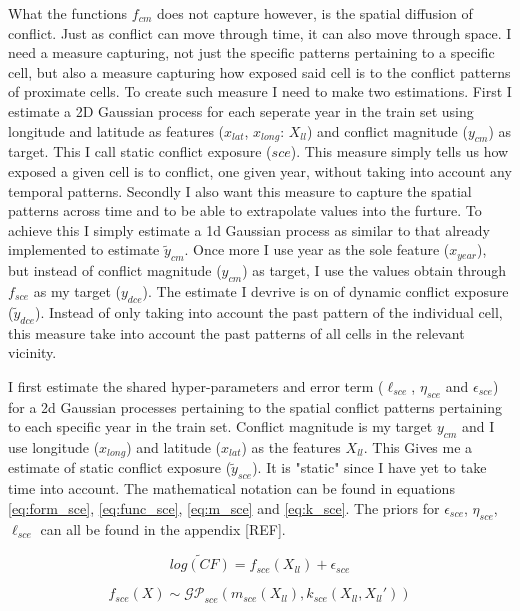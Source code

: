 \documentclass[a4paper]{article}
\begin{document}
What the functions $f_{cm}$ does not capture however, is the spatial diffusion of conflict. Just as conflict can move through time, it can also move through space. I need a measure capturing, not just the specific patterns pertaining to a specific cell, but also a measure capturing how exposed said cell is to the conflict patterns of proximate cells. To create such measure I need to make two estimations. First I estimate a 2D Gaussian process for each seperate year in the train set using longitude and latitude as features ($x_{lat}$, $x_{long}$: $X_{ll}$) and conflict magnitude  ($y_{cm}$) as target. This I call static conflict exposure ($sce$). This measure simply tells us how exposed a given cell is to conflict, one given year, without taking into account any temporal patterns. Secondly I also want this measure to capture the spatial patterns across time and to be able to extrapolate values into the furture. To achieve this I simply estimate a 1d Gaussian process as similar to that already implemented to estimate $\tilde{y}_{cm}$. Once more I use year as the sole feature ($x_{year}$), but instead of conflict magnitude ($y_{cm}$) as target, I use the values obtain through $f_{sce}$ as my target ($y_{dce}$). The estimate I devrive is on of dynamic conflict exposure ($\tilde{y}_{dce}$). Instead of only taking into account the past pattern of the individual cell, this measure take into account the past patterns of all cells in the relevant vicinity.\par 

I first estimate the shared hyper-parameters and error term ($\ell_{sce}$, $\eta_{sce}$ and $\epsilon_{sce}$) for a 2d Gaussian processes pertaining to the spatial conflict patterns pertaining to each specific year in the train set. Conflict magnitude is my target $y_{cm}$ and I use longitude ($x_{long}$) and latitude ($x_{lat}$) as the features $X_{ll}$. This Gives me a estimate of static conflict exposure ($\tilde{y}_{sce}$). It is "static" since I have yet to take time into account. The mathematical notation can be found in equations \ref{eq:form_sce}, \ref{eq:func_sce}, \ref{eq:m_sce} and \ref{eq:k_sce}.  The priors for $\epsilon_{sce}$, $\eta_{sce}$, $\ell_{sce}$ can all be found in the appendix [REF].\par

\[
\widetilde{log(CF)} = f_{sce}(X_{ll}) + \epsilon_{sce} \tag{23} \label{eq:form_sce}
\]

\[
f_{sce}(X) \sim \mathcal{GP}_{sce}(m_{sce}(X_{ll}),k_{sce}(X_{ll},X_{ll}')) \tag{24} \label{eq:func_sce}
\]
\end{document}
